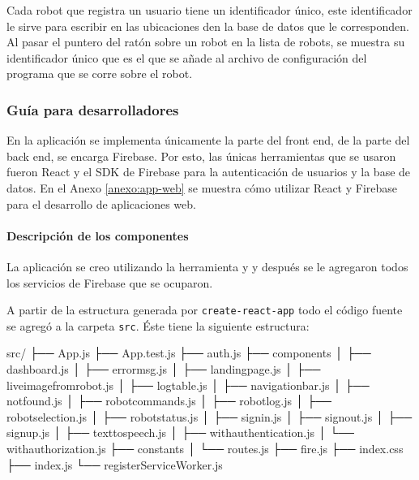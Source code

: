 Cada robot que registra un usuario tiene un identificador único, este identificador
le sirve para escribir en las ubicaciones den la base de datos que le corresponden.
Al pasar el puntero del ratón sobre un robot en la lista de robots, se muestra
su identificador único que es el que se añade al archivo de configuración
del programa que se corre sobre el robot.


\subsubsection{Guía para desarrolladores}
\label{\detokenize{code_docs:documentacion-para-desarrolladores}}\label{\detokenize{code_docs::doc}}
En la aplicación se implementa únicamente la parte del front end, de la parte
del back end, se encarga Firebase. Por esto, las únicas herramientas que se
usaron fueron React y el SDK de Firebase para la autenticación de usuarios y la base
de datos.
En el Anexo \ref{anexo:app-web} se muestra cómo 
utilizar React y Firebase para el desarrollo
de aplicaciones web.



\paragraph{Descripción de los componentes}
\label{\detokenize{code_docs:creacion-del-proyecto}}

La aplicación se creo utilizando la herramienta
 y 
y después se le agregaron todos los servicios de Firebase
que se ocuparon. 

A partir de la estructura generada por \texttt{create-react-app}
todo el código fuente se agregó a la carpeta
\texttt{src}. Éste tiene la siguiente estructura:


%
\begin{sphinxVerbatim}[commandchars=\\\{\}]
src/
├── App.js
├── App.test.js
├── auth.js
├── components
│   ├── dashboard.js
│   ├── error\PYGZus{}msg.js
│   ├── landing\PYGZus{}page.js
│   ├── live\PYGZus{}image\PYGZus{}from\PYGZus{}robot.js
│   ├── log\PYGZus{}table.js
│   ├── navigation\PYGZus{}bar.js
│   ├── not\PYGZus{}found.js
│   ├── robot\PYGZus{}commands.js
│   ├── robot\PYGZus{}log.js
│   ├── robot\PYGZus{}selection.js
│   ├── robot\PYGZus{}status.js
│   ├── signin.js
│   ├── signout.js
│   ├── signup.js
│   ├── text\PYGZus{}to\PYGZus{}speech.js
│   ├── with\PYGZus{}authentication.js
│   └── with\PYGZus{}authorization.js
├── constants
│   └── routes.js
├── fire.js
├── index.css
├── index.js
└── registerServiceWorker.js
\end{sphinxVerbatim}


